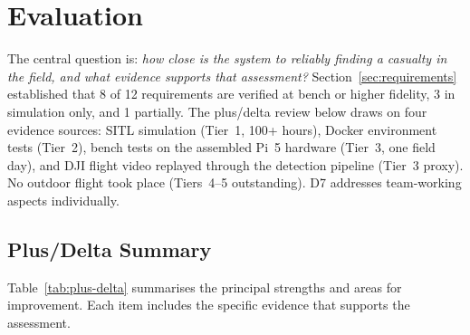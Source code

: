 \section{Evaluation}\label{sec:evaluation}

The central question is: \emph{how close is the system to reliably finding a casualty in the field, and what evidence supports that assessment?} Section~\ref{sec:requirements} established that 8 of 12 requirements are verified at bench or higher fidelity, 3 in simulation only, and 1 partially. The plus/delta review below draws on four evidence sources: SITL simulation (Tier~1, 100+ hours), Docker environment tests (Tier~2), bench tests on the assembled Pi~5 hardware (Tier~3, one field day), and DJI flight video replayed through the detection pipeline (Tier~3 proxy). No outdoor flight took place (Tiers~4--5 outstanding). D7 addresses team-working aspects individually.

\subsection{Plus/Delta Summary}\label{sec:plus-delta}

Table~\ref{tab:plus-delta} summarises the principal strengths and areas for improvement. Each item includes the specific evidence that supports the assessment.

